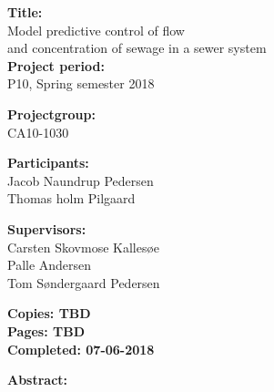 \begin{minipage}[t]{0.48\textwidth}
\textbf{Title:} \\[5pt]\hspace*{2ex}
Model predictive control of flow   \\\hspace*{2ex}
and concentration of sewage in a sewer system  \\

\textbf{Project period:} \\[5pt]\bigskip\hspace{2ex}
P10, Spring semester 2018

\textbf{Projectgroup:} \\[5pt]\bigskip\hspace{2ex}
CA10-1030

\textbf{Participants:} \\[5pt]\hspace*{2ex}
Jacob Naundrup Pedersen \\\hspace*{2ex}
Thomas holm Pilgaard \\\hspace*{2ex}


\textbf{Supervisors:} \\[5pt]\hspace*{2ex}
Carsten Skovmose Kallesøe \\\hspace*{2ex}
Palle Andersen \\ \hspace*{2ex} %
Tom Søndergaard Pedersen \\\hspace*{2ex}


\vspace*{3.0cm}

\textbf{Copies: TBD} \\
\textbf{Pages: TBD}\\
\textbf{Completed: 07-06-2018}\\

\end{minipage}
\hfill
\begin{minipage}[t]{0.483\textwidth}
\textbf{Abstract:} \\[5pt]
\fbox{\parbox{7cm}{\bigskip\bigskip}}
\end{minipage}

\vfill

{\footnotesize\itshape}





